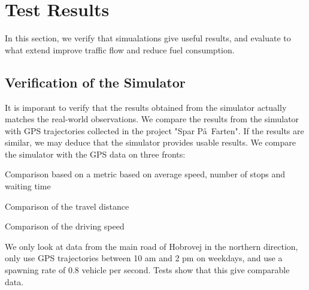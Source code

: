 \section{Test Results}\label{sec:Test}
In this section, we verify that simualations give useful results, and evaluate to what extend \tech improve traffic flow and reduce fuel consumption.

\subsection{Verification of the Simulator}
It is imporant to verify that the results obtained from the simulator actually matches the real-world observations.
We compare the results from the simulator with GPS trajectories collected in the project "Spar P\aa\ Farten".
If the results are similar, we may deduce that the simulator provides usable results.
We compare the simulator with the GPS data on three fronts: 
\vspace{-5mm}
\begin{enumerate*}
\item Comparison based on a metric based on average speed, number of stops and waiting time
\item Comparison of the travel distance 
\item Comparison of the driving speed
\end{enumerate*}

We only look at data from the main road of Hobrovej in the northern direction, only use GPS trajectories between 10 am and 2 pm on weekdays, and use a spawning rate of $0.8$ vehicle per second.
Tests show that this give comparable data.


